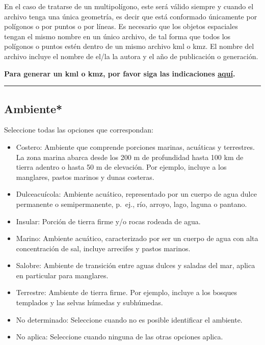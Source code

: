 \documentclass[
]{book}
\providecommand{\tightlist}{%
  \setlength{\itemsep}{0pt}\setlength{\parskip}{0pt}}
\begin{document}
En el caso de tratarse de un multipolígono, este será válido siempre y cuando el archivo tenga una única geometría, es decir que está conformado únicamente por polígonos o por puntos o por líneas. Es necesario que los objetos espaciales tengan el mismo nombre en un único archivo, de tal forma que todos los polígonos o puntos estén dentro de un mismo archivo kml o kmz. El nombre del archivo incluye el nombre de el/la la autora y el año de publicación o generación.

\textbf{Para generar un kml o kmz, por favor siga las indicaciones \href{https://www.youtube.com/watch?v=j_SHMEp3bao}{aquí}.}

\begin{center}\rule{0.5\linewidth}{0.5pt}\end{center}

\hypertarget{ambiente}{%
\subsection*{\texorpdfstring{{Ambiente*}}{Ambiente*}}\label{ambiente}}

Seleccione todas las opciones que correspondan:

\begin{itemize}
\tightlist
\item
  Costero: Ambiente que comprende porciones marinas, acuáticas y terrestres. La zona marina abarca desde los 200 m de profundidad hasta 100 km de tierra adentro o hasta 50 m de elevación. Por ejemplo, incluye a los manglares, pastos marinos y dunas costeras.
\item
  Dulceacuícola: Ambiente acuático, representado por un cuerpo de agua dulce permanente o semipermanente, p.~ej., río, arroyo, lago, laguna o pantano.
\item
  Insular: Porción de tierra firme y/o rocas rodeada de agua.
\item
  Marino: Ambiente acuático, caracterizado por ser un cuerpo de agua con alta concentración de sal, incluye arrecifes y pastos marinos.
\item
  Salobre: Ambiente de transición entre aguas dulces y saladas del mar, aplica en particular para manglares.
\item
  Terrestre: Ambiente de tierra firme. Por ejemplo, incluye a los bosques templados y las selvas húmedas y subhúmedas.
\item
  No determinado: Seleccione cuando no es posible identificar el ambiente.
\item
  No aplica: Seleccione cuando ninguna de las otras opciones aplica.
\end{itemize}
\end{document}
